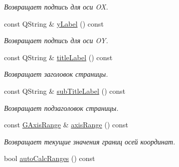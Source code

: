 \begin{DoxyCompactItemize}
\begin{DoxyCompactList}\small\item\em Возвращает подпись для оси OX. \end{DoxyCompactList}\item 
const Q\+String \& \hyperlink{class_graph_sheet_ad3fc3d583c9550f85ef53abf0897b10d}{y\+Label} () const \hypertarget{class_graph_sheet_ad3fc3d583c9550f85ef53abf0897b10d}{}\label{class_graph_sheet_ad3fc3d583c9550f85ef53abf0897b10d}

\begin{DoxyCompactList}\small\item\em Возвращает подпись для оси OY. \end{DoxyCompactList}\item 
const Q\+String \& \hyperlink{class_graph_sheet_ab930e02ab41a8380fed327c7090955b7}{title\+Label} () const \hypertarget{class_graph_sheet_ab930e02ab41a8380fed327c7090955b7}{}\label{class_graph_sheet_ab930e02ab41a8380fed327c7090955b7}

\begin{DoxyCompactList}\small\item\em Возвращает заголовок страницы. \end{DoxyCompactList}\item 
const Q\+String \& \hyperlink{class_graph_sheet_a0c2e11b986ff4f6e98f664f25a69d0f2}{sub\+Title\+Label} () const \hypertarget{class_graph_sheet_a0c2e11b986ff4f6e98f664f25a69d0f2}{}\label{class_graph_sheet_a0c2e11b986ff4f6e98f664f25a69d0f2}

\begin{DoxyCompactList}\small\item\em Возвращает подзаголовок страницы. \end{DoxyCompactList}\item 
const \hyperlink{struct_g_axis_range}{G\+Axis\+Range} \& \hyperlink{class_graph_sheet_a36397b018c3c882a0704f3632eb010c7}{axis\+Range} () const \hypertarget{class_graph_sheet_a36397b018c3c882a0704f3632eb010c7}{}\label{class_graph_sheet_a36397b018c3c882a0704f3632eb010c7}

\begin{DoxyCompactList}\small\item\em Возвращает текущие значения границ осей координат. \end{DoxyCompactList}\item 
bool \hyperlink{class_graph_sheet_a445b980e074ef651f816e8094bc0166b}{auto\+Calc\+Ranges} () const \hypertarget{class_graph_sheet_a445b980e074ef651f816e8094bc0166b}{}\label{class_graph_sheet_a445b980e074ef651f816e8094bc0166b}


\end{DoxyCompactItemize}
